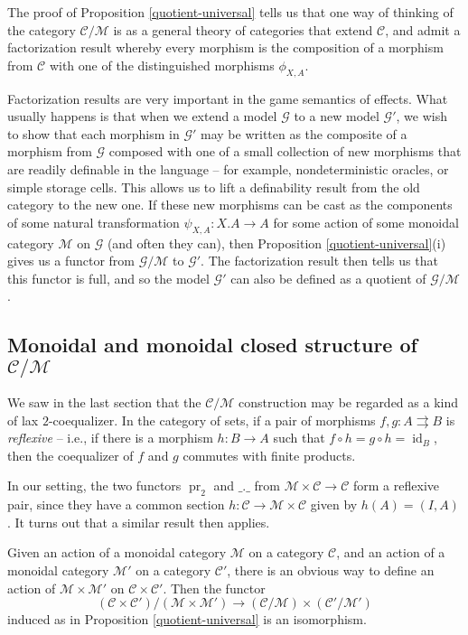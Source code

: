 \documentclass{svproc}
\newcommand\C{\mathcal{C}}
\newcommand\G{\mathcal{G}}
\newcommand\M{\mathcal{M}}
\DeclareMathOperator\pr{pr}
\DeclareMathOperator\id{id}
\newcommand*\from{\colon}
\newcommand{\0}{{\mathtt{0}}} \newcommand{\com}{{\mathtt{com}}}
\begin{document}
\begin{remark}
  The proof of Proposition \ref{quotient-universal} tells us that one way of thinking of the category $\C/\M$ is as a general theory of categories that extend $\C$, and admit a factorization result whereby every morphism is the composition of a morphism from $\C$ with one of the distinguished morphisms $\phi_{X,A}$.

  Factorization results are very important in the game semantics of effects.  
  What usually happens is that when we extend a model $\G$ to a new model $\G'$, we wish to show that each morphism in $\G'$ may be written as the composite of a morphism from $\G$ composed with one of a small collection of new morphisms that are readily definable in the language -- for example, nondeterministic oracles, or simple storage cells.  
  This allows us to lift a definability result from the old category to the new one.  
  If these new morphisms can be cast as the components of some natural transformation $\psi_{X,A}\from X.A \to A$ for some action of some monoidal category $\M$ on $\G$ (and often they can), then Proposition \ref{quotient-universal}(i) gives us a functor from $\G/\M$ to $\G'$.  
  The factorization result then tells us that this functor is full, and so the model $\G'$ can also be defined as a quotient of $\G/\M$.
\end{remark}

\subsection{Monoidal and monoidal closed structure of $\C/\M$}

We saw in the last section that the $\C/\M$ construction may be regarded as a kind of lax $2$-coequalizer.  
In the category of sets, if a pair of morphisms $f,g\from A \rightrightarrows B$ is \emph{reflexive} -- i.e., if there is a morphism $h\from B \to A$ such that $f\circ h = g\circ h = \id_B$, then the coequalizer of $f$ and $g$ commutes with finite products.  

In our setting, the two functors $\pr_2$ and $\_.\_$ from $\M\times\C \to \C$ form a reflexive pair, since they have a common section $h\from \C \to \M\times \C$ given by $h(A) = (I, A)$.  
It turns out that a similar result then applies.

\begin{proposition}
  Given an action of a monoidal category $\M$ on a category $\C$, and an action of a monoidal category $\M'$ on a category $\C'$, there is an obvious way to define an action of $\M\times\M'$ on $\C\times\C'$.  
  Then the functor
  \[
    (\C\times\C')/(\M\times\M') \to (\C/\M) \times (\C'/\M')
    \]
  induced as in Proposition \ref{quotient-universal} is an isomorphism.
  \label{monoidality}
\end{proposition}
\end{document}
